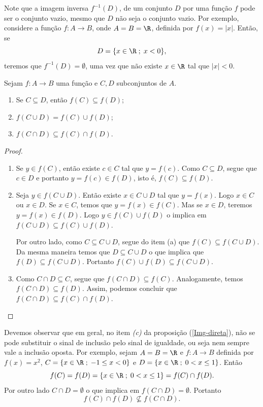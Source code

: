 \documentclass{article}
\begin{document}
Note que a imagem inversa $f^{-1}(D)$, de um conjunto $D$ por uma
fun\c{c}\~ao $f$ pode ser o conjunto vazio, mesmo que $D$ n\~ao seja o
conjunto vazio. Por exemplo, considere a fun\c{c}\~ao $f:A \rightarrow
B$, onde $A=B=\R$, definida por $f(x)=|x|$. Ent\~ao, se $$D=\{x \in
\R\;;\; x<0\},$$ teremos que $f^{-1}(D)=\emptyset$, uma vez que
n\~ao existe $x \in \R$ tal que $|x|<0$.

\begin{proposition}\label{Img-direta}
Sejam $f:A \rightarrow B$ uma fun\c{c}\~ao e $C, D$ subconjuntos de $A$.
\begin{enumerate}
    \item[(a)] Se $C \subseteq D$, ent\~ao $f(C)\subseteq f(D)$;
    \item[(b)] $f(C \cup D)=f(C)\cup f(D)$;
    \item[(c)] $f(C \cap D) \subseteq f(C)\cap f(D)$.
\end{enumerate}
\end{proposition}
\begin{proof}\mbox{}
\begin{enumerate}
    \item[(a)] Se $y \in f(C)$, ent\~ao existe $c \in C$ tal que $y
    = f(c)$. Como $C \subseteq D$, segue que $c \in D$ e portanto
    $y=f(c) \in f(D)$, isto \'e, $f(C)\subseteq f(D)$.
    \item[(b)] Seja $y \in f(C \cup D)$. Ent\~ao existe $x \in C \cup
    D$ tal que $y=f(x)$. Logo $x \in C$ ou $x \in D$. Se $x \in
    C$, temos que $y=f(x) \in f(C)$. Mas se $x \in D$, teremos
    $y=f(x) \in f(D)$. Logo $y \in f(C) \cup f(D)$ o implica em
    $f(C \cup D)\subseteq f(C)\cup f(D)$.

    Por outro lado, como $C \subseteq C \cup D$, segue do item (a)
    que $f(C) \subseteq f(C \cup D)$. Da mesma maneira temos que $D
    \subseteq C \cup D$ o que implica que $f(D) \subseteq f(C \cup D)$.
    Portanto $f(C)\cup f(D)\subseteq f(C \cup D)$.
    \item[(c)] Como $C \cap D \subseteq C$, segue que $f(C\cap D)
    \subseteq f(C)$. Analogamente, temos $f(C\cap D)\subseteq
    f(D)$. Assim, podemos concluir que $f(C \cap D) \subseteq
    f(C)\cap f(D)$.
\end{enumerate}
\end{proof}

Devemos observar que em geral, no item \emph{(c)} da proposi\c{c}\~ao
(\ref{Img-direta}), n\~ao se pode substituir o sinal de inclus\~ao
pelo sinal de igualdade, ou seja nem sempre vale a inclus\~ao
oposta. Por exemplo, sejam $A=B=\R$ e $f:A \rightarrow B$ definida
por $f(x)=x^2$, $C=\{x \in \R\;;\; -1 \leq x <0\}$ e $D=\{x \in \R
\;;\; 0 <x \leq 1\}$. Ent\~ao
$$
f(C)=f(D)=\{x \in \R \;;\; 0 <x \leq 1\}=f(C)\cap f(D).
$$
Por outro lado $C \cap D= \emptyset$ o que implica em $f(C \cap
D)=\emptyset$. Portanto $$f(C)\cap f(D) \nsubseteq f(C \cap D).$$
\end{document}
